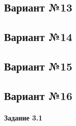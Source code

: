 \documentclass[a4paper, 12pt]{article}
\begin{document}
\pagebreak
\subsection{Вариант №13}

\pagebreak
\subsection{Вариант №14}

\pagebreak
\subsection{Вариант №15}

\pagebreak
\subsection{Вариант №16}
\paragraph{Задание 3.1}
\end{document}
